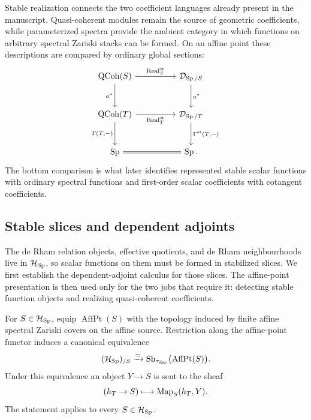 Stable realization connects the two coefficient languages already present in
the manuscript. Quasi-coherent modules remain the source of geometric
coefficients, while parameterized spectra provide the ambient category in
which functions on arbitrary spectral Zariski stacks can be formed. On an
affine point these descriptions are compared by ordinary global sections:
\[
\begin{tikzcd}[column sep=huge,row sep=large]
  \QCoh(S)
      \arrow[r,"\operatorname{Real}^{\mathrm{st}}_S"]
      \arrow[d,"a^*"']
  &
  \mathcal D_{\Sp/S}
      \arrow[d,"a^*"]
  \\
  \QCoh(T)
      \arrow[r,"\operatorname{Real}^{\mathrm{st}}_T"']
      \arrow[d,"{\Gamma(T,-)}"']
  &
  \mathcal D_{\Sp/T}
      \arrow[d,"{\Gamma^{\mathrm{st}}(T,-)}"]
  \\
  \Sp \arrow[r,equal] & \Sp .
\end{tikzcd}
\]
The bottom comparison is what later identifies represented stable scalar
functions with ordinary spectral functions and first-order scalar coefficients
with cotangent coefficients.
\subsection{Stable slices and dependent adjoints}
\label{sec:parameterized-stable}

The de Rham relation objects, effective quotients, and de Rham
neighbourhoods live in \(\mathcal H_{\operatorname{Sp}}\), so scalar functions on them must be
formed in stabilized slices. We first establish the dependent-adjoint calculus
for those slices. The affine-point presentation is then used only for the two
jobs that require it: detecting stable function objects and realizing
quasi-coherent coefficients.

\begin{proposition}
\label{prop:affine-point-slice-site}
For \(S\in\mathcal H_{\operatorname{Sp}}\), equip \(\operatorname{AffPt}(S)\) with the topology induced by finite affine spectral
Zariski covers on the affine source. Restriction along the affine-point functor induces a
canonical equivalence
\[
  (\mathcal H_{\operatorname{Sp}})_{/S}
  \xrightarrow{\simeq}
  \operatorname{Sh}_{\tau_{\mathrm{Zar}}}\bigl(\operatorname{AffPt}(S)\bigr).
\]
Under this equivalence an object \(Y\to S\) is sent to the sheaf
\[
  (h_T\to S)\longmapsto\operatorname{Map}_S(h_T,Y).
\]
The statement applies to every \(S\in\mathcal H_{\operatorname{Sp}}\).
\end{proposition}

